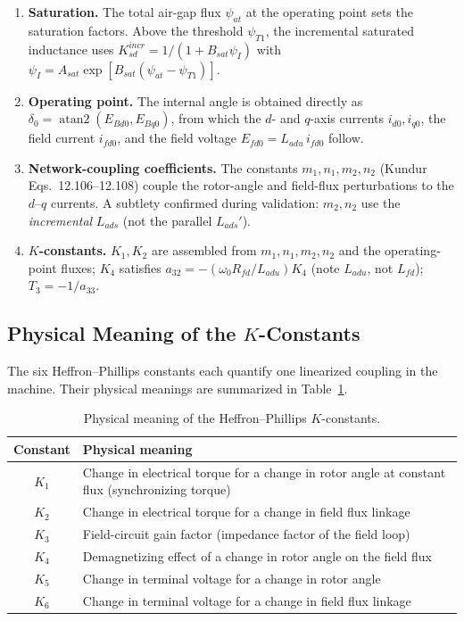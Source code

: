 \documentclass[12pt,a4paper]{article}
\begin{document}
\begin{enumerate}
    \item \textbf{Saturation.} The total air-gap flux $\psi_{at}$ at the
          operating point sets the saturation factors. Above the threshold
          $\psi_{T1}$, the incremental saturated inductance uses
          $K_{sd}^{incr} = 1/(1 + B_{sat}\psi_I)$ with
          $\psi_I = A_{sat}\exp[B_{sat}(\psi_{at}-\psi_{T1})]$.
    \item \textbf{Operating point.} The internal angle is obtained directly as
          $\delta_0 = \operatorname{atan2}(E_{Bd0}, E_{Bq0})$, from which the
          $d$- and $q$-axis currents $i_{d0}, i_{q0}$, the field current
          $i_{fd0}$, and the field voltage $E_{fd0} = L_{adu}\,i_{fd0}$ follow.
    \item \textbf{Network-coupling coefficients.} The constants $m_1, n_1, m_2,
          n_2$ (Kundur Eqs.~12.106--12.108) couple the rotor-angle and
          field-flux perturbations to the $d$--$q$ currents. A subtlety
          confirmed during validation: $m_2, n_2$ use the \emph{incremental}
          $L_{ads}$ (not the parallel $L_{ads}'$).
    \item \textbf{$K$-constants.} $K_1, K_2$ are assembled from
          $m_1, n_1, m_2, n_2$ and the operating-point fluxes; $K_4$ satisfies
          $a_{32} = -(\omega_0 R_{fd}/L_{adu})K_4$ (note $L_{adu}$, not
          $L_{fd}$); $T_3 = -1/a_{33}$.
\end{enumerate}

\subsection{Physical Meaning of the $K$-Constants}

The six Heffron--Phillips constants each quantify one linearized coupling in the
machine. Their physical meanings are summarized in Table~\ref{tab:kmeaning}.

\begin{table}[H]
\centering
\caption{Physical meaning of the Heffron--Phillips $K$-constants.}
\label{tab:kmeaning}
\begin{tabular}{@{}c p{11cm}@{}}
\toprule
Constant & Physical meaning \\
\midrule
$K_1$ & Change in electrical torque for a change in rotor angle at constant flux
        (synchronizing torque) \\
$K_2$ & Change in electrical torque for a change in field flux linkage \\
$K_3$ & Field-circuit gain factor (impedance factor of the field loop) \\
$K_4$ & Demagnetizing effect of a change in rotor angle on the field flux \\
$K_5$ & Change in terminal voltage for a change in rotor angle \\
$K_6$ & Change in terminal voltage for a change in field flux linkage \\
\bottomrule
\end{tabular}
\end{table}
\end{document}
